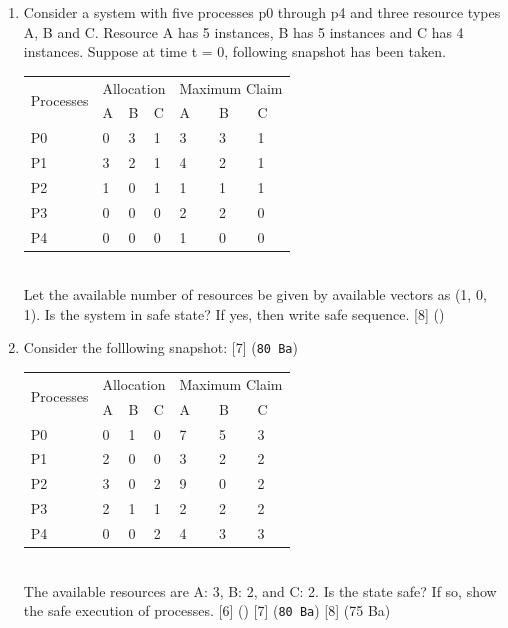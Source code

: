 \documentclass[12pt]{article}
\begin{document}
\begin{enumerate}
			\item Consider a system with five processes p0 through p4 and three resource types A, B and C. Resource A has 5 instances, B has 5 instances and C has 4 instances. Suppose at time t = 0, following snapshot has been taken.\\
			\begin{tabular}{|p{17mm}|p{7mm}|p{7mm}|p{7mm}|p{7mm}|p{7mm}|p{7mm}|}
				\hline
				\multirow{2}{*}{Processes} & \multicolumn{3}{|c|}{Allocation} & \multicolumn{3}{|c|}{Maximum Claim} \\ \cline{2-7}
				& A & B & C & A & B & C \\ \hline
				P0 & 0 & 3 & 1 & 3 & 3 & 1 \\ \hline
				P1 & 3 & 2 & 1 & 4 & 2 & 1 \\ \hline
				P2 & 1 & 0 & 1 & 1 & 1 & 1 \\ \hline
				P3 & 0 & 0 & 0 & 2 & 2 & 0 \\ \hline
				P4 & 0 & 0 & 0 & 1 & 0 & 0 \\ \hline
			\end{tabular}\\
			Let the available number of resources be given by available vectors as (1, 0, 1). Is the system in safe state? If yes, then write safe sequence. \hfill [8] (\bo{80 Ch})

			\item Consider the folllowing snapshot: \hfill [7] (\texttt{80 Ba})\\
			\begin{tabular}{|p{17mm}|p{7mm}|p{7mm}|p{7mm}|p{7mm}|p{7mm}|p{7mm}|}
				\hline
				\multirow{2}{*}{Processes} & \multicolumn{3}{|c|}{Allocation} & \multicolumn{3}{|c|}{Maximum Claim} \\ \cline{2-7}
				& A & B & C & A & B & C \\ \hline
				P0 & 0 & 1 & 0 & 7 & 5 & 3 \\ \hline
				P1 & 2 & 0 & 0 & 3 & 2 & 2 \\ \hline
				P2 & 3 & 0 & 2 & 9 & 0 & 2 \\ \hline
				P3 & 2 & 1 & 1 & 2 & 2 & 2 \\ \hline
				P4 & 0 & 0 & 2 & 4 & 3 & 3 \\ \hline
			\end{tabular}\\
			The available resources are A: 3, B: 2, and C: 2. Is the state safe? If so, show the safe execution of processes. \hfill [6] () [7] (\texttt{80 Ba}) [8] (75 Ba)


\end{enumerate}
\end{document}
